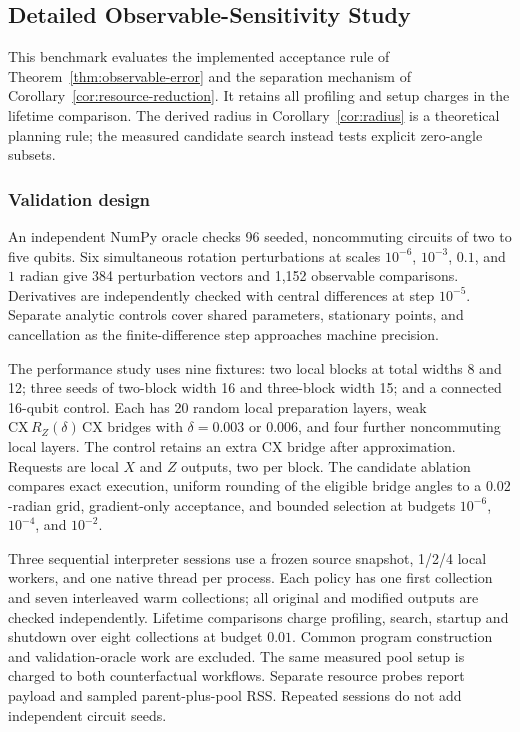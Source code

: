 \subsection{Detailed Observable-Sensitivity Study}
This benchmark evaluates the implemented acceptance rule of Theorem~\ref{thm:observable-error} and the separation mechanism of Corollary~\ref{cor:resource-reduction}. It retains all profiling and setup charges in the lifetime comparison. The derived radius in Corollary~\ref{cor:radius} is a theoretical planning rule; the measured candidate search instead tests explicit zero-angle subsets.

\subsubsection{Validation design}
An independent NumPy oracle checks 96 seeded, noncommuting circuits of two to five qubits. Six simultaneous rotation perturbations at scales $10^{-6}$, $10^{-3}$, $0.1$, and $1$ radian give 384 perturbation vectors and 1,152 observable comparisons. Derivatives are independently checked with central differences at step $10^{-5}$. Separate analytic controls cover shared parameters, stationary points, and cancellation as the finite-difference step approaches machine precision.

The performance study uses nine fixtures: two local blocks at total widths 8 and 12; three seeds of two-block width 16 and three-block width 15; and a connected 16-qubit control. Each has 20 random local preparation layers, weak $\mathrm{CX}\,R_Z(\delta)\,\mathrm{CX}$ bridges with $\delta=0.003$ or $0.006$, and four further noncommuting local layers. The control retains an extra CX bridge after approximation. Requests are local $X$ and $Z$ outputs, two per block. The candidate ablation compares exact execution, uniform rounding of the eligible bridge angles to a $0.02$-radian grid, gradient-only acceptance, and bounded selection at budgets $10^{-6}$, $10^{-4}$, and $10^{-2}$.

Three sequential interpreter sessions use a frozen source snapshot, 1/2/4 local workers, and one native thread per process. Each policy has one first collection and seven interleaved warm collections; all original and modified outputs are checked independently. Lifetime comparisons charge profiling, search, startup and shutdown over eight collections at budget $0.01$. Common program construction and validation-oracle work are excluded. The same measured pool setup is charged to both counterfactual workflows. Separate resource probes report payload and sampled parent-plus-pool RSS. Repeated sessions do not add independent circuit seeds.


